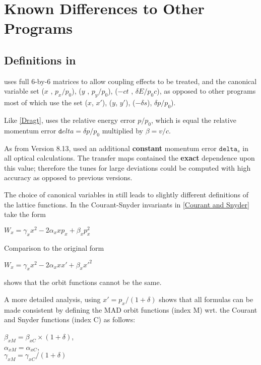 
\chapter{Known Differences to Other Programs}

\section{Definitions in \madeight}

\madeight uses full 6-by-6 matrices to allow coupling effects to be treated,
and the canonical variable set ($x$ , $p_x / p_0$),
($y$ , $p_y / p_0$), ($-ct$ , $\delta E / p_0 c$), as opposed to other
programs most of which use the set ($x$, $x'$), ($y$, $y'$),
($-\delta s$), $\delta p / p_0$). 

Like \href{bibliography.html#dragt}{[Dragt]}, \madeight uses the relative
energy error $p / p_0$, which is equal the relative momentum error
${\texttt delta} = \delta p / p_0$ multiplied by $\beta = v/c$.  

As from Version 8.13, \madeight used an additional \textbf{constant}
momentum error $\texttt{delta}_s$ in all optical calculations. 
The transfer maps contained the \textbf{exact} dependence upon this
value; therefore the tunes for large deviations could be computed with
high accuracy as opposed to previous versions.  
 
The choice of canonical variables in \madx still leads to slightly
different definitions of the lattice functions. In \madx the
Courant-Snyder invariants in \href{bibliography.html#courant}{[Courant
    and Snyder]} take the form 

$W_x = \gamma_x x^2 - 2 \alpha_x x p_x + \beta_x  p_x^2$

Comparison to the original form 

$W_x = \gamma_x x^2 - 2 \alpha_x x x' + \beta_x  {x'}^2$

shows that the orbit functions cannot be the same. 

A more detailed analysis, using 
$x' = p_x / (1 + \delta)$
shows that all formulas can be made consistent by defining the MAD orbit
functions (index M) wrt. the Courant and Snyder functions (index C) as follows:

$\beta_{xM} = \beta_{xC} \times (1 + \delta)$, \\
$\alpha_{xM} = \alpha_{xC}$, \\
$\gamma_{xM} = \gamma_{xC} / (1 + \delta)$

